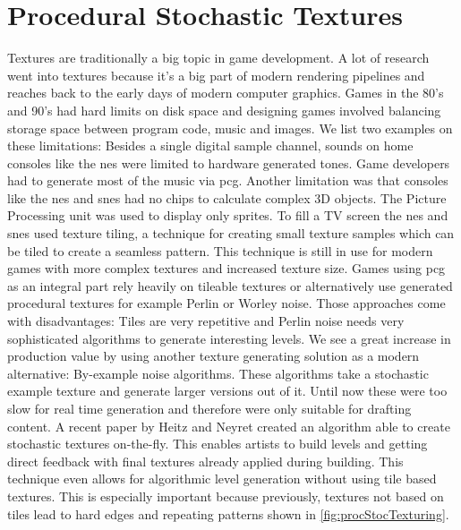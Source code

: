 \documentclass[10pt,a4paper]{article}
\begin{document}
\section{Procedural Stochastic Textures}
\begin{multicols}{2}
Textures are traditionally a big topic in game development. A lot of research went into textures because it’s a big part of modern rendering pipelines and reaches back to the early days of modern computer graphics. Games in the 80’s and 90’s had hard limits on disk space\cite{Ferrari2016} and designing games involved balancing storage space between program code, music and images. We list two examples on these limitations: Besides a single digital sample channel, sounds on home consoles like the \gls{nes} were limited to hardware generated tones\cite{wiki:NintendoEntertainmentSystem}. Game developers had to generate most of the music via \gls{pcg}. Another limitation was that consoles like the \gls{nes} and \gls{snes} had no chips to calculate complex 3D objects. The Picture Processing unit was used to display only sprites. To fill a TV screen the \gls{nes} and \gls{snes} used texture tiling, a technique for creating small texture samples which can be tiled to create a seamless pattern. This technique is still in use for modern games with more complex textures and increased texture size. Games using \gls{pcg} as an integral part rely heavily on tileable textures or alternatively use generated procedural textures for example Perlin\cite{perlin1985image} or Worley\cite{worley1996cellular} noise. Those approaches come with disadvantages: Tiles are very repetitive and Perlin noise needs very sophisticated algorithms to generate interesting levels. We see a great increase in production value by using another texture generating solution as a modern alternative: By-example noise algorithms. These algorithms take a stochastic example texture and generate larger versions out of it. Until now these were too slow for real time generation and therefore were only suitable for drafting content. A recent paper by Heitz and Neyret created an algorithm able to create stochastic textures on-the-fly\cite{Heitz2018}. This enables artists to build levels and getting direct feedback with final textures already applied during building. This technique even allows for algorithmic level generation without using tile based textures. This is especially important because previously, textures not based on tiles lead to hard edges and repeating patterns shown in \autoref{fig:procStocTexturing}.
\end{multicols}
\end{document}
